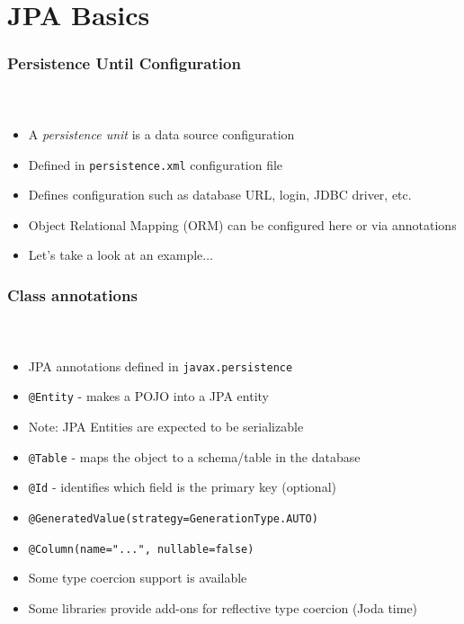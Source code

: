 \documentclass{beamer}
\begin{document}
\section{JPA Basics}

\begin{frame}[fragile]
  \frametitle{Persistence Until Configuration}
  \framesubtitle{~}

\begin{itemize}
  \item A \emph{persistence unit} is a data source configuration
  \item Defined in \lstinline|persistence.xml| configuration file
  \item Defines configuration such as database URL, login, JDBC driver, etc.
  \item Object Relational Mapping (ORM) can be configured here or via annotations
  \item Let's take a look at an example$\ldots$
\end{itemize}

\end{frame}

\begin{frame}[fragile]
  \frametitle{Class annotations}
  \framesubtitle{~}

\begin{itemize}
  \item JPA annotations defined in \lstinline|javax.persistence|
  \item \lstinline|@Entity| - makes a POJO into a JPA entity
  \item Note: JPA Entities are expected to be serializable
  \item \lstinline|@Table| - maps the object to a schema/table in the database
  \item \lstinline|@Id| - identifies which field is the primary key (optional)
  \item \lstinline|@GeneratedValue(strategy=GenerationType.AUTO)|
  \item \lstinline|@Column(name="...", nullable=false)|
  \item Some type coercion support is available
  \item Some libraries provide add-ons for reflective type coercion (Joda time)
\end{itemize}

\end{frame}
\end{document}
